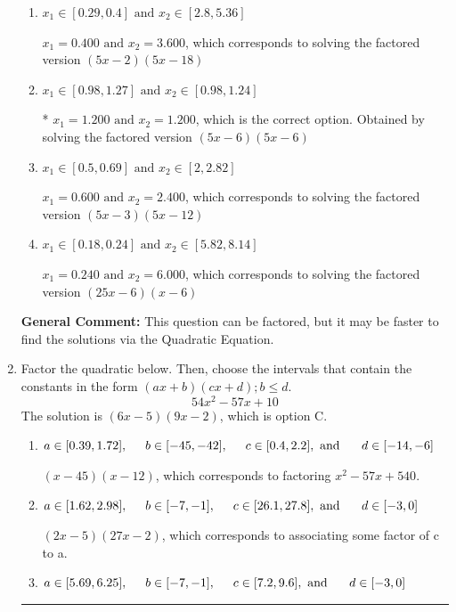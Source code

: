 \documentclass{extbook}[14pt]
\newcommand{\litem}[1]{\item #1

\rule{\textwidth}{0.4pt}}
\begin{document}
\begin{enumerate}
{\begin{enumerate}[label=\Alph*.]
$x_1 = 30.000 \text{ and } x_2 = 30.000$, which corresponds to solving the factored version $(x -30)(x -30)$
\item \( x_1 \in [0.29, 0.4] \text{ and } x_2 \in [2.8, 5.36] \)

$x_1 = 0.400 \text{ and } x_2 = 3.600$, which corresponds to solving the factored version $(5x -2)(5x -18)$
\item \( x_1 \in [0.98, 1.27] \text{ and } x_2 \in [0.98, 1.24] \)

* $x_1 = 1.200 \text{ and } x_2 = 1.200$, which is the correct option. Obtained by solving the factored version $(5x -6)(5x -6)$
\item \( x_1 \in [0.5, 0.69] \text{ and } x_2 \in [2, 2.82] \)

$x_1 = 0.600 \text{ and } x_2 = 2.400$, which corresponds to solving the factored version $(5x -3)(5x -12)$
\item \( x_1 \in [0.18, 0.24] \text{ and } x_2 \in [5.82, 8.14] \)

$x_1 = 0.240 \text{ and } x_2 = 6.000$, which corresponds to solving the factored version $(25x -6)(x -6)$
\end{enumerate}

\textbf{General Comment:} This question can be factored, but it may be faster to find the solutions via the Quadratic Equation.
}
\litem{
Factor the quadratic below. Then, choose the intervals that contain the constants in the form $(ax+b)(cx+d); b \leq d.$
\[ 54x^{2} -57 x + 10 \]The solution is \( (6x -5)(9x -2) \), which is option C.\begin{enumerate}[label=\Alph*.]
\item \( a \in [0.39, 1.72], \hspace*{5mm} b \in [-45, -42], \hspace*{5mm} c \in [0.4, 2.2], \text{ and } \hspace*{5mm} d \in [-14, -6] \)

 $(x -45)(x -12)$, which corresponds to factoring $x^{2} -57 x + 540$.
\item \( a \in [1.62, 2.98], \hspace*{5mm} b \in [-7, -1], \hspace*{5mm} c \in [26.1, 27.8], \text{ and } \hspace*{5mm} d \in [-3, 0] \)

 $(2x -5)(27x -2)$, which corresponds to associating some factor of c to a.
\item \( a \in [5.69, 6.25], \hspace*{5mm} b \in [-7, -1], \hspace*{5mm} c \in [7.2, 9.6], \text{ and } \hspace*{5mm} d \in [-3, 0] \)


\end{enumerate}}
\end{enumerate}
\end{document}
